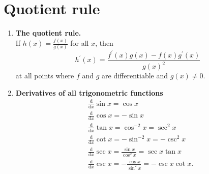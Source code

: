 \section{Quotient rule}
\begin{enumerate}
    \item \textbf{The quotient rule.}\\
        \indent If \(h(x)=\frac{f(x)}{g(x)}\) for all \(x\), then
        \[
            h^\prime (x)=\frac{f^\prime (x)g(x)-f(x)g^\prime (x)}{g(x)^2}
        \]
        at all points where \(f\) and \(g\) are differentiable and \(g(x)\neq 0\).
    \item \textbf{Derivatives of all trigonometric functions}
        \begin{align*}
            & \frac{\mathrm{d}}{\mathrm{d}x}\sin x=\cos x\\
            & \frac{\mathrm{d}}{\mathrm{d}x}\cos x=-\sin x\\
            & \frac{\mathrm{d}}{\mathrm{d}x}\tan x=\cos^{-2}x=\sec^2 x\\
            & \frac{\mathrm{d}}{\mathrm{d}x}\cot x=-\sin^{-2}x=-\csc^2 x\\
            & \frac{\mathrm{d}}{\mathrm{d}x}\sec x=\frac{\sin x}{\cos^2 x}=\sec x\tan x\\
            & \frac{\mathrm{d}}{\mathrm{d}x}\csc x=-\frac{\cos x}{\sin^2 x}=-\csc x\cot x.
        \end{align*}
\end{enumerate}

